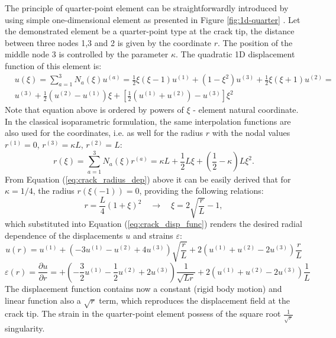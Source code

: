 \documentclass[11pt]{acmeArticle}
\numberwithin{equation}{section}
\begin{document}
The principle of quarter-point element can be straightforwardly introduced by using simple one-dimensional element as presented in Figure \ref{fig:1d-quarter} \citep{kuna2013finite}.
Let the demonstrated element be a quarter-point type at the crack tip, the distance between three nodes 1,3 and 2 is given by the coordinate $r$. The position of the middle node 3 is controlled by the parameter $\kappa$. The quadratic 1D displacement function of this element is: 
\begin{equation}\label{eq:crack_disp_func}
\begin{aligned}
&u(\xi) = \sum_{a=1}^3 N_a (\xi) u^{(a)} = \frac{1}{2} \xi (\xi - 1)u^{(1)} + (1 - \xi^2)u^{(3)} + \frac{1}{2} \xi (\xi + 1)u^{(2)} =\\
& u^{(3)} + \frac{1}{2}(u^{(2)} - u^{(1)})\xi + \left[ \frac{1}{2} (u^{(1)} + u^{(2)}) - u^{(3)} \right] \xi^2 
\end{aligned}
\end{equation}
Note that equation above is ordered by powers of $\xi$ - element natural coordinate. In the classical isoparametric formulation, the same interpolation functions are also used for the coordinates, i.e. as well for the radius $r$ with the nodal values $r^{(1)} = 0$, $r^{(3)} = \kappa L$, $r^{(2)} = L$:
\begin{equation}\label{eq:crack_radius_dep}
r(\xi) = \sum_{a=1}^3 N_a (\xi) r^{(a)} = \kappa L + \frac{1}{2} L \xi  + \left(  \frac{1}{2} - \kappa \right) L \xi^2.
\end{equation}
From Equation (\ref{eq:crack_radius_dep}) above it can be easily derived that for $ \kappa=1/4$, the radius $r(\xi(-1)) = 0$, providing the following relations:
\begin{equation}
r= \frac{L}{4}(1+\xi)^2 \quad \rightarrow \quad \xi = 2 \sqrt{\frac{r}{L}} -1,
\end{equation}
which substituted into Equation (\ref{eq:crack_disp_func}) renders the desired radial dependence of the displacements $u$ and strains $\varepsilon$:
\begin{equation*}
u(r) = u^{(1)} + \left( -3u^{(1)} - u^{(2)} +4u^{(3)} \right) \sqrt{\frac{r}{L}} + 2 \left( u^{(1)} + u^{(2)} -2 u^{(3)} \right) \frac{r}{L}
\end{equation*}
\begin{equation}
\varepsilon(r) = \frac{\partial u}{ \partial r} = + \left( - \frac{3}{2}u^{(1)} - \frac{1}{2}u^{(2)} +2u^{(3)} \right) \frac{1}{\sqrt{Lr}} + 2 \left( u^{(1)} + u^{(2)} -2 u^{(3)} \right) \frac{1}{L}
\end{equation}
The displacement function contains now a constant (rigid body motion) and linear function also a $\sqrt r$ term, which reproduces the displacement field at the crack tip. The strain in the quarter-point element possess of the square root $\frac{1}{\sqrt r}$ singularity.
\end{document}
